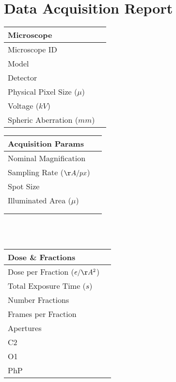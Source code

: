 \documentclass[12pt,a4paper]{article}
\begin{document}
\section*{\\Data Acquisition Report}
\def\arraystretch{1.25}  %
\begin{tabulary}{\linewidth}{L L}
  \hline{}Microscope & \\\hline
  Microscope ID & \\\hline
  Model & \\\hline
  Detector & \\\hline
  Physical Pixel Size ($\mu$) & \\\hline
  Voltage ($kV$)& \\\hline
  Spheric Aberration ($mm$)& \\\hline
\end{tabulary}
%
  \hspace{1cm}
%
\begin{tabulary}{\linewidth}{L L}
  \hline
  Acquisition Params &  \\\hline
  Nominal Magnification &  \\\hline
  Sampling Rate ($\AA/px$)& \\\hline
  Spot Size &  \\\hline
  Illuminated Area ($\mu$)& \\\hline
   & \\
   & \\
\end{tabulary}\\\\
   \newline
%
\begin{tabulary}{\linewidth}{L L}
  \\\hline
  Dose \& Fractions &  \\\hline
  Dose per Fraction ($e/\AA^2$) & 
       \\\hline
  Total Exposure Time ($s$)& 
       \\\hline
  Number Fractions & 
       \\\hline
  Frames per Fraction & 
      \\\hline
  Apertures &  \\\hline
  C2  &  \\\hline
  O1  &  \\\hline
  PhP &  \\\hline
\end{tabulary}
\end{document}
